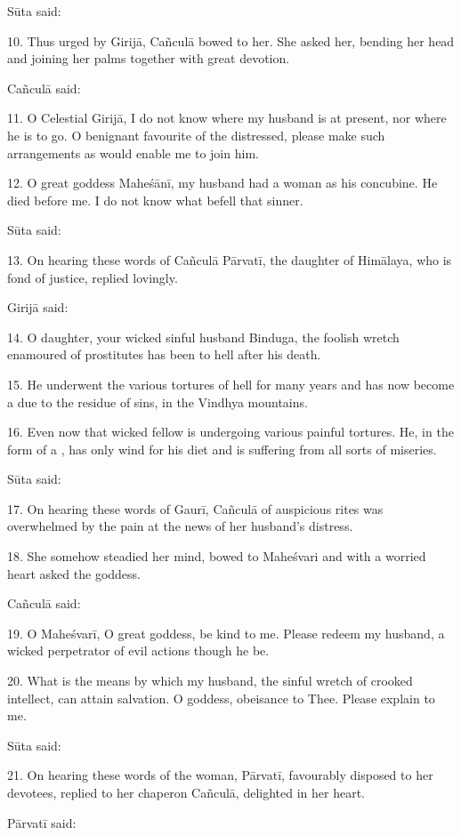 Sūta said:

10. Thus urged by Girijā, Cañculā bowed to her. She asked her, bending her head
and joining her palms together with great devotion.

Cañculā said:

11. O Celestial Girijā, I do not know where my husband is at present, nor where
he is to go. O benignant favourite of the distressed, please make such
arrangements as would enable me to join him.

12. O great goddess Maheśānī, my husband had a  woman as his concubine.
He died before me. I do not know what befell that sinner.

Sūta said:

13. On hearing these words of Cañculā Pārvatī, the daughter of Himālaya, who is
fond of justice, replied lovingly.

Girijā said:

14. O daughter, your wicked sinful husband Binduga, the foolish wretch enamoured
of prostitutes has been to hell after his death.

15. He underwent the various tortures of hell for many years and has now become
a  due to the residue of sins, in the Vindhya mountains.

16. Even now that wicked fellow is undergoing various painful tortures. He, in
the form of a , has only wind for his diet and is suffering from all
sorts of miseries.

Sūta said:

17. On hearing these words of Gaurī, Cañculā of auspicious rites was overwhelmed
by the pain at the news of her husband’s distress.

18. She somehow steadied her mind, bowed to Maheśvari and with a worried heart
asked the goddess.

Cañculā said:

19. O Maheśvarī, O great goddess, be kind to me. Please redeem my husband,
a wicked perpetrator of evil actions though he be.

20. What is the means by which my husband, the sinful wretch of crooked
intellect, can attain salvation. O goddess, obeisance to Thee. Please explain
to me.

Sūta said:

21. On hearing these words of the woman, Pārvatī, favourably disposed to her
devotees, replied to her chaperon Cañculā, delighted in her heart.

Pārvatī said:

